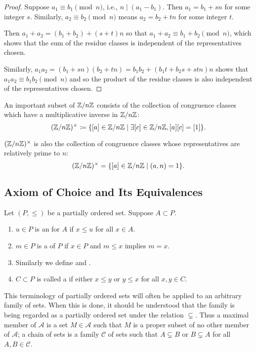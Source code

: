 \begin{example}
\begin{proof}
Suppose $a_1\equiv b_1\pmod n$, i.e., $n\mid(a_1-b_1)$. Then $a_1=b_1+sn$ for some integer $s$. Similarly, $a_2\equiv b_2\pmod n$ means $a_2=b_2+tn$ for some integer $t$.

Then $a_1+a_2=(b_1+b_2)+(s+t)n$ so that $a_1+a_2\equiv b_1+b_2\pmod n$, which shows that the sum of the residue classes is independent of the representatives chosen.

Similarly, $a_1a_2=(b_1+sn)(b_2+tn)=b_1b_2+(b_1t+b_2s+stn)n$ shows that $a_1a_2\equiv b_1b_2\pmod n$ and so the product of the residue classes is also independent of the representatives chosen.
\end{proof}

An important subset of $\mathbb Z/n\mathbb Z$ consists of the collection of congruence classes which have a multiplicative inverse in $\mathbb Z/n\mathbb Z$:
\[(\mathbb Z/n\mathbb Z)^\times\coloneqq\{[a]\in\mathbb Z/n\mathbb Z\mid\exists[c]\in\mathbb Z/n\mathbb Z,[a][c]=[1]\}.\]

\begin{proposition*}
$(\mathbb Z/n\mathbb Z)^\times$ is also the collection of congruence classes whose representatives are relatively prime to $n$:
\[(\mathbb Z/n\mathbb Z)^\times=\{[a]\in\mathbb Z/n\mathbb Z\mid(a,n)=1\}.\]
\end{proposition*}
\end{example}

\subsection{Axiom of Choice and Its Equivalences}
\begin{definition}
Let $(P,\le)$ be a partially ordered set. Suppose $A\subset P$.
\begin{enumerate}[label=(\roman*)]
\item $u\in P$ is an  for $A$ if $x\le u$ for all $x\in A$.
\item $m\in P$ is a  of $P$ if $x\in P$ and $m\le x$ implies $m=x$.
\item Similarly we define  and .
\item $C\subset P$ is called a  if either $x\le y$ or $y\le x$ for all $x,y\in C$.
\end{enumerate}
\end{definition}

This terminology of partially ordered sets will often be applied to an arbitrary family of sets. When this is done, it should be understood that the family is being regarded as a partially ordered set under the relation $\subsetneq$. Thus a maximal member of $\mathscr{A}$ is a set $M\in\mathscr{A}$ such that $M$ is a proper subset of no other member of $\mathscr{A}$; a chain of sets is a family $\mathscr{C}$ of sets such that $A\subsetneq B$ or $B\subsetneq A$ for all $A,B\in\mathscr{C}$.

